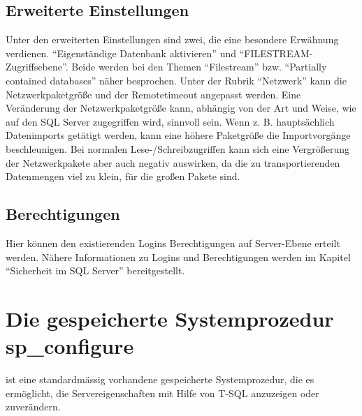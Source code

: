       \subsection{Erweiterte Einstellungen}
        Unter den erweiterten Einstellungen sind zwei, die eine
        besondere Erwähnung verdienen. \enquote{Eigenständige Datenbank
        aktivieren} und \enquote{FILESTREAM-Zugriffsebene}. Beide werden bei den
        Themen \enquote{Filestream} bzw. \enquote{Partially contained databases}
        näher besprochen.
        Unter der Rubrik \enquote{Netzwerk} kann die Netzwerkpaketgröße und
        der Remotetimeout angepasst werden. Eine Veränderung der
        Netzwerkpaketgröße kann, abhängig von der Art und Weise, wie auf den
        SQL Server zugegriffen wird, sinnvoll sein. Wenn z. B. hauptsächlich
        Datenimports getätigt werden, kann eine höhere Paketgröße die
        Importvorgänge beschleunigen. Bei normalen Lese-/Schreibzugriffen kann
        sich eine Vergrößerung der Netzwerkpakete aber auch negativ auswirken,
        da die zu transportierenden Datenmengen viel zu klein, f\"ur die großen
        Pakete sind.
        \begin{literaturinternet}
          \item \cite{ms189357}
        \end{literaturinternet}          
      \subsection{Berechtigungen}
        Hier können den existierenden Logins Berechtigungen auf Server-Ebene
        erteilt werden. Nähere Informationen zu Logins und Berechtigungen
        werden im Kapitel \enquote{Sicherheit im SQL Server} bereitgestellt.
        
    \section{Die gespeicherte Systemprozedur sp\_configure}
       ist eine standardmässig vorhandene
      gespeicherte Systemprozedur, die es ermöglicht, die
      Servereigenschaften mit Hilfe von T-SQL anzuzeigen oder zuverändern.
